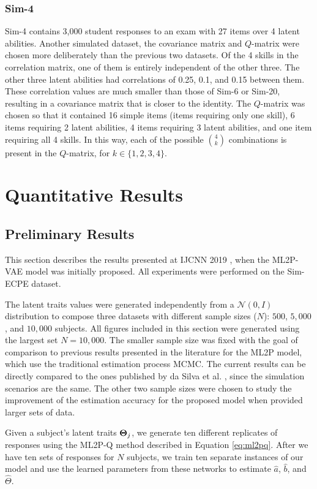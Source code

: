 \subsubsection*{Sim-4} Sim-4 contains 3,000 student responses to an exam with 27 items over 4 latent abilities. Another simulated dataset, the covariance matrix and $Q$-matrix were chosen more deliberately than the previous two datasets. Of the 4 skills in the correlation matrix, one of them is entirely independent of the other three. The other three latent abilities had correlations of 0.25, 0.1, and 0.15 between them. These correlation values are much smaller than those of Sim-6 or Sim-20, resulting in a covariance matrix that is closer to the identity. The $Q$-matrix was chosen so that it contained 16 simple items (items requiring only one skill), 6 items requiring 2 latent abilities, 4 items requiring 3 latent abilities, and one item requiring all 4 skills. In this way, each of the possible $\binom{4}{k}$ combinations is present in the $Q$-matrix, for $k\in \{1,2,3,4\}$.

\section{Quantitative Results}

\subsection{Preliminary Results}\label{sec:prelim}
This section describes the results presented at IJCNN 2019 \cite{ijcnn_paper}, when the ML2P-VAE model was initially proposed. All experiments were performed on the Sim-ECPE dataset.

The latent traits values were generated independently from a $\mathcal{N}(0,I)$ distribution to compose three datasets with different sample sizes ($N$): $500$, $5,000$, and $10,000$ subjects. All figures included in this section were generated using the largest set $N=10,000$. The smaller sample size was fixed with the goal of comparison to previous results presented in the literature for the ML2P model, which use the traditional estimation process MCMC. The current results can be directly compared to the ones published by da Silva et al. \cite{daSilva2018}, since the simulation scenarios are the same. The other two sample sizes were chosen to study the improvement of the estimation accuracy for the proposed model when provided larger sets of data.

Given a subject's latent traits $\boldsymbol{\Theta}_j$, we generate ten different replicates of responses using the ML2P-Q method \cite{daSilva2018} described in Equation \ref{eq:ml2pq}. After we have ten sets of responses for $N$ subjects, we train ten separate instances of our model and use the learned parameters from these networks to estimate $\hat{a}$, $\hat{b}$, and $\hat{\Theta}$.

